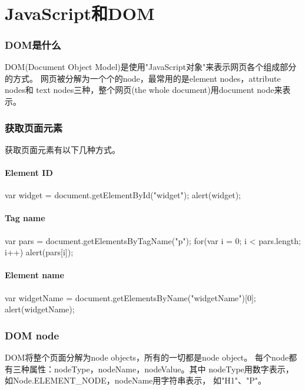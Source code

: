\documentclass[a4paper,11pt]{article}
\begin{document}
\tt %
\pagestyle{header}
\sybmaketitle
\tableofcontents
\newpage

\pagestyle{main}
\setcounter{page}{1}

\part[JavaScript和DOM]{JavaScript和DOM}
\section[DOM是什么]{DOM是什么}
DOM(Document Object Model)是使用"JavaScript对象"来表示网页各个组成部分的方式。
网页被分解为一个个的node，最常用的是element nodes，attribute nodes和
text nodes三种，整个网页(the whole document)用document node来表示。

\section[获取页面元素]{获取页面元素}
获取页面元素有以下几种方式。
\subsection[Element ID]{Element ID}
\begin{javascriptcode}
  var widget = document.getElementById("widget");
  alert(widget);
\end{javascriptcode}

\subsection[Tag name]{Tag name}
\begin{javascriptcode}
  var pars = document.getElementsByTagName("p");
  for(var i = 0; i < pars.length; i++) {
    alert(pars[i]);
  }
\end{javascriptcode}

\subsection[Element name]{Element name}
\begin{javascriptcode}
  var widgetName = document.getElementsByName("widgetName")[0];
  alert(widgetName);
\end{javascriptcode}

\section[DOM node]{DOM node}
DOM将整个页面分解为node objects，所有的一切都是node object。
每个node都有三种属性：nodeType，nodeName，nodeValue。其中
nodeType用数字表示，如Node.ELEMENT\_NODE，nodeName用字符串表示，
如"H1"、"P"。
\end{document}
